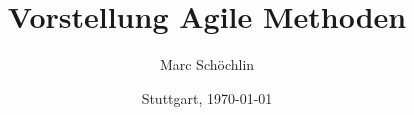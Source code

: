 \documentclass[10pt,compress]{beamer}
\title{Vorstellung Agile Methoden}
\author{Marc Schöchlin}
\institute[]{%
  Amselweg 28/1\\
  71686 Remseck\\
  ms@256bit.org
  }
\date{Stuttgart, \today}
\begin{document}
\frame{\titlepage}






\end{document}
